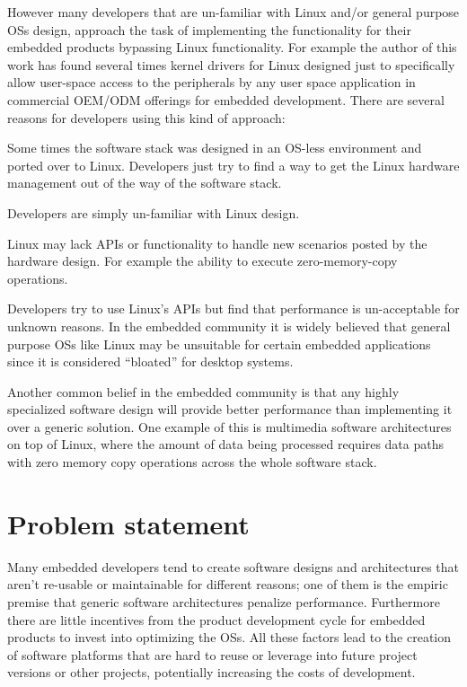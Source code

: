 However many developers that are un-familiar with Linux and/or general purpose \acp{OS} design, approach the task of implementing the functionality for their embedded products bypassing Linux functionality. For example the author of this work has found several times kernel drivers for Linux designed just to specifically allow user-space access to the peripherals by any user space application in commercial \ac{OEM}/\ac{ODM} offerings for embedded development.  There are several reasons for developers using this kind of approach:
\begin{itemize*}
\item Some times the software stack was designed in an \ac{OS}-less environment and ported over to Linux. Developers just try to find a way to get the Linux hardware management out of the way of the software stack.
\item Developers are simply un-familiar with Linux design.
\item Linux may lack APIs or functionality to handle new scenarios posted by the hardware design. For example the ability to execute zero-memory-copy operations.
\item Developers try to use Linux's APIs but find that performance is un-acceptable for unknown reasons. In the embedded community it is widely believed that general purpose \acp{OS} like Linux may be unsuitable for certain embedded applications since it is considered ``bloated'' for desktop systems.
\end{itemize*}

Another common belief in the embedded community is that any highly specialized software design will provide better performance than implementing it over a generic solution. One example of this is multimedia software architectures on top of Linux, where the amount of data being processed requires data paths with zero memory copy operations across the whole software stack.
 
\section{Problem statement}
Many embedded developers tend to create software designs and architectures that aren't re-usable or maintainable for different reasons; one of them is the empiric premise that generic software architectures penalize performance. Furthermore there are little incentives from the product development cycle for embedded products to invest into optimizing the \acp{OS}. All these factors lead to the creation of software platforms that are hard to reuse or leverage into future project versions or other projects, potentially increasing the costs of development.

